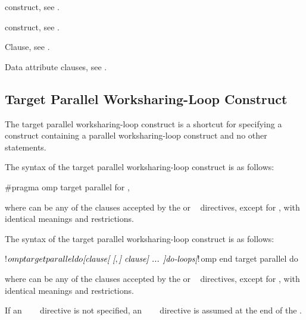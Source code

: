 \begin{crossrefs}
\item {} construct, see
.

\item {} construct, see
.

\item {} Clause, see .

\item Data attribute clauses, see
.
\end{crossrefs}



\subsection{Target Parallel Worksharing-Loop Construct}
\label{subsec:Target Parallel Worksharing-Loop Construct}
\summary
The target parallel worksharing-loop construct is a shortcut for specifying 
a  construct containing a parallel worksharing-loop construct 
and no other statements.

\syntax
\begin{ccppspecific}
The syntax of the target parallel worksharing-loop construct is as follows:

\begin{ompcPragma}
#pragma omp target parallel for \plc{[clause[ [},\plc{] clause] ... ] new-line}
\end{ompcPragma}

where  can be any of the clauses accepted by the  or
~ directives, except for , with identical 
meanings and restrictions.
\end{ccppspecific}

\begin{fortranspecific}
The syntax of the target parallel worksharing-loop construct is as follows:

\begin{ompfPragma}
!$omp target parallel do \plc{[clause[ [},\plc{] clause] ... ]}
    \plc{do-loops}
\plc{[}!$omp end target parallel do\plc{]}
\end{ompfPragma}

where  can be any of the clauses accepted by the  or
~ directives, except for , with identical 
meanings and restrictions.

If an ~~~ directive is not 
specified, an ~~~ directive 
is assumed at the end of the .
\end{fortranspecific}

